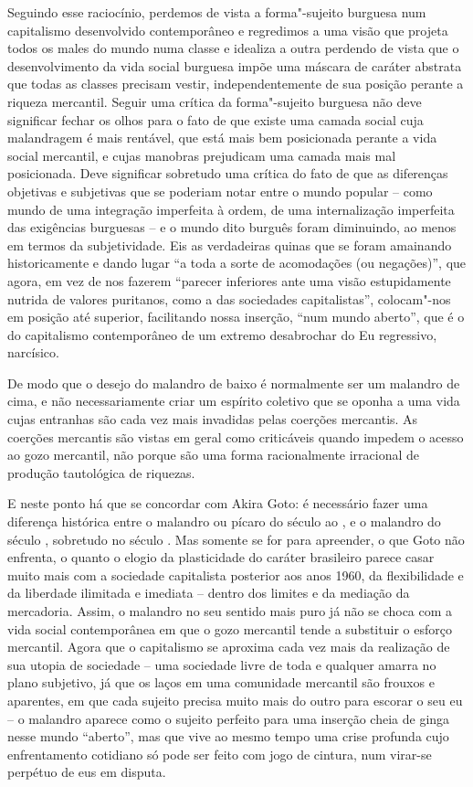 {Seguindo esse raciocínio, perdemos de vista a forma"-sujeito burguesa num
capitalismo desenvolvido contemporâneo e regredimos a uma visão que
projeta todos os males do mundo numa classe e idealiza a outra perdendo
de vista que o desenvolvimento da vida social burguesa impõe uma máscara
de caráter abstrata que todas as classes precisam vestir,
independentemente de sua posição perante a riqueza mercantil. Seguir uma
crítica da forma"-sujeito burguesa não deve significar fechar os olhos
para o fato de que existe uma camada social cuja malandragem é mais
rentável, que está mais bem posicionada perante a vida social mercantil,
e cujas manobras prejudicam uma camada mais mal posicionada. Deve
significar sobretudo uma crítica do fato de que as diferenças objetivas
e subjetivas que se poderiam notar entre o mundo popular -- como mundo
de uma integração imperfeita à ordem, de uma internalização imperfeita
das exigências burguesas -- e o mundo dito burguês foram diminuindo, ao
menos em termos da subjetividade. Eis as verdadeiras quinas que se foram
amainando historicamente e dando lugar ``a toda a sorte de acomodações
(ou negações)'', que agora, em vez de nos fazerem ``parecer inferiores
ante uma visão estupidamente nutrida de valores puritanos, como a das
sociedades capitalistas'', colocam"-nos em posição até superior,
facilitando nossa inserção, ``num mundo aberto'', que é o do capitalismo
contemporâneo de um extremo desabrochar do Eu regressivo, narcísico.

De modo que o desejo do malandro de baixo é normalmente ser um malandro
de cima, e não necessariamente criar um espírito coletivo que se oponha
a uma vida cujas entranhas são cada vez mais invadidas pelas coerções
mercantis. As coerções mercantis são vistas em geral como criticáveis
quando impedem o acesso ao gozo mercantil, não porque são uma forma
racionalmente irracional de produção tautológica de riquezas.

E neste ponto há que se concordar com Akira Goto: é necessário fazer uma
diferença histórica entre o malandro ou pícaro do século  ao , e o
malandro do século , sobretudo no século . Mas somente se for para
apreender, o que Goto não enfrenta, o quanto o elogio da plasticidade do
caráter brasileiro parece casar muito mais com a sociedade capitalista
posterior aos anos 1960, da flexibilidade e da liberdade ilimitada e
imediata -- dentro dos limites e da mediação da mercadoria. Assim, o
malandro no seu sentido mais puro já não se choca com a vida social
contemporânea em que o gozo mercantil tende a substituir o esforço
mercantil. Agora que o capitalismo se aproxima cada vez mais da
realização de sua utopia de sociedade -- uma sociedade livre de toda e
qualquer amarra no plano subjetivo, já que os laços em uma comunidade
mercantil são frouxos e aparentes, em que cada sujeito precisa muito
mais do outro para escorar o seu eu -- o malandro aparece como o sujeito
perfeito para uma inserção cheia de ginga nesse mundo ``aberto'', mas
que vive ao mesmo tempo uma crise profunda cujo enfrentamento cotidiano
só pode ser feito com jogo de cintura, num virar-se perpétuo de eus em
disputa.

}
